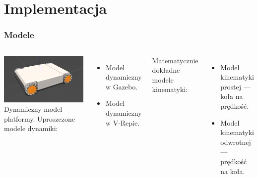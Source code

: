 \documentclass{beamer}
\begin{document}
	\section{Implementacja}
	\begin{frame}
		\frametitle{Modele}
		\begin{columns}[c]
			\centering
			\includegraphics[width=\textwidth]{graphics/model.png} \\
			Dynamiczny model platformy.
			Uproszczone modele dynamiki:
			\begin{itemize}
				\item Model dynamiczny w Gazebo.
				\item Model dynamiczny w V-Repie.
			\end{itemize}
			Matematycznie dokładne modele kinematyki:
			\begin{itemize}
				\item Model kinematyki prostej --- koła na prędkość.
				\item Model kinematyki odwrotnej --- prędkość na koła.
			\end{itemize}
		\end{columns}
	\end{frame}
	
\end{document}
